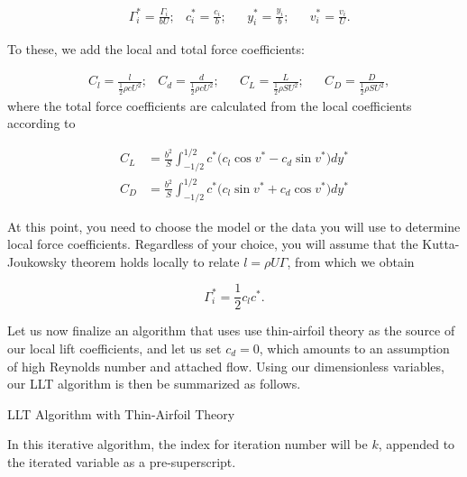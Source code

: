 \documentclass[11pt,letter]{ejlnotes}
\begin{document}
{		\begin{align}
			&\Gamma_i^* = \frac{\Gamma_i}{b U}; 
			&c_i^* = \frac{c_i}{b}; &&y_i^* = \frac{y_i}{b}; &&v_i^* = \frac{v_i}{U}.
		\end{align}
			
		To these, we add the local and total force coefficients:
		
		\begin{align}
		&C_l = \frac{l}{\frac{1}{2} \rho c U^2}; &C_d = \frac{d}{\frac{1}{2} \rho c U^2}; &&C_L = \frac{L}{\frac{1}{2}\rho S U^2}; &&C_D = \frac{D}{\frac{1}{2}\rho S U^2},
		\end{align}
		where the total force coefficients are calculated from the local coefficients according to
		
		\begin{align}
			C_L &= \frac{b^2}{S} \int_{-1/2}^{1/2} c^* \bigg( c_l \cos v^* - c_d \sin v^* \bigg) dy^* \label{eq:CL} \\
			C_D &= \frac{b^2}{S} \int_{-1/2}^{1/2} c^* \bigg( c_l \sin v^* + c_d \cos v^* \bigg) dy^* \label{eq:CD}
		\end{align}
		
		At this point, you need to choose the model or the data you will use to determine local force coefficients.  Regardless of your choice, you will assume that the Kutta-Joukowsky theorem holds locally to relate $l = \rho U \Gamma$, from which we obtain 
		
		\begin{equation}
			\Gamma_i^* = \frac{1}{2} c_l c^*. \label{eq:Gammacl}
		\end{equation}
		
		Let us now finalize an algorithm that uses use thin-airfoil theory as the source of our local lift coefficients, and let us set $c_d = 0$, which amounts to an assumption of high Reynolds number and attached flow.  Using our dimensionless variables, our LLT algorithm is then be summarized as follows.
		
		\begin{callouttitle}{LLT Algorithm with Thin-Airfoil Theory}
			
			In this iterative algorithm, the index for iteration number will be $k$, appended to the iterated variable as a pre-superscript.
			

\end{callouttitle}}
\end{document}
